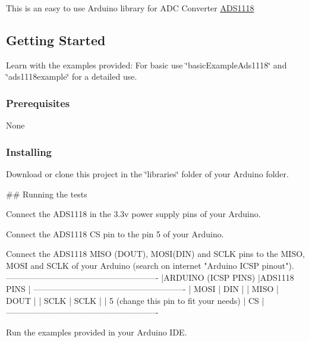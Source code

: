 This is an easy to use Arduino library for A\+DC Converter \mbox{\hyperlink{class_a_d_s1118}{A\+D\+S1118}}

\subsection*{Getting Started}

Learn with the examples provided\+: For basic use \char`\"{}basic\+Example\+Ads1118\char`\"{} and \char`\"{}ads1118example\char`\"{} for a detailed use.

\subsubsection*{Prerequisites}

None

\subsubsection*{Installing}

Download or clone this project in the \char`\"{}libraries\char`\"{} folder of your Arduino folder.

\#\# Running the tests 
\begin{DoxyCode}
Connect the ADS1118 in the 3.3v power supply pins of your Arduino.
\end{DoxyCode}



\begin{DoxyCode}
Connect the ADS1118 CS pin to the pin 5 of your Arduino.
\end{DoxyCode}



\begin{DoxyCode}
Connect the ADS1118 MISO (DOUT), MOSI(DIN) and SCLK pins to the MISO, MOSI and SCLK of your Arduino (search
       on internet "Arduino ICSP pinout").
-------------------------------------------------------
|ARDUINO (ICSP PINS)                    |ADS1118 PINS |
-------------------------------------------------------
| MOSI                                  |   DIN       |
| MISO                                  |   DOUT      | 
| SCLK                                  |   SCLK      |
| 5 (change this pin to fit your needs) |   CS        |
-------------------------------------------------------
\end{DoxyCode}



\begin{DoxyCode}
Run the examples provided in your Arduino IDE.
\end{DoxyCode}



